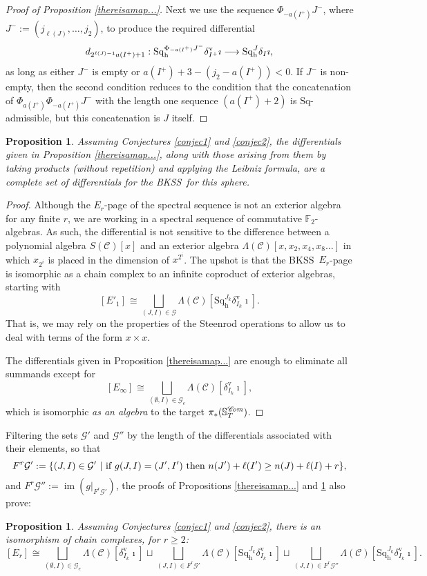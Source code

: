 \documentclass[11pt]{amsart} \renewcommand{\baselinestretch}{1.2}
\theoremstyle{plain}
\newtheorem{prop}[thm]{Proposition}
\numberwithin{equation}{section} %
\theoremstyle{plain}
\newtheorem{prop}[thm]{Proposition}
\numberwithin{equation}{chapter} %
\DeclareMathOperator{\im}{im}
\renewcommand{\to}{\longrightarrow}
\newcommand{\scrC}{\mathscr{C}}
\newcommand{\calg}{\mathcal{G}}
\newcommand{\CommOperad}{{\scrC}}
\newcommand{\Sq}{\mathrm{Sq}}
\newcommand{\F}{\mathbb{F}}
\newcommand{\algs}{{\scrC\!\textit{\normalfont\textit{om}}}}
\newcommand{\Ftwo}{\F_2}
\newcommand{\Eprime}[5]{[E'_{#2}#3]^{#4}_{#5}}
\newcommand{\E}[5]{[E^{#1}_{#2}#3]^{#4}_{#5}}
\newcommand{\uver}{^\mathrm{v}}
\newcommand{\dhor}{_\mathrm{h}}
\newcommand{\Sqh}{\mathrm{Sq}\dhor}
\newcommand{\deltav}{\delta\uver}
\newcommand{\BKSS}{BKSS}
\begin{document}
\begin{The Bousfield-Kan spectral sequence for a sphere}
\begin{proof}[Proof of Proposition \ref{thereisamap...}]
Next we use the sequence $\Phi_{-a(I^{+})}J^{-}$, where $J^-:=(j_{\ell(J)},\ldots,j_2)$, to produce the required differential
\[d_{2^{\ell(J)-1}a(I^{+})+1}:\Sqh^{\Phi_{\smash{-a(I^{+})}}J^{-}}\deltav_{I^{+}}\imath\to \Sqh^J\delta_I\imath,\]
as long as either $J^{-}$ is empty or  $a(I^{+})+3-(j_2-a(I^{+}))< 0$. If $J^{-}$ is non-empty, then the second condition reduces to the condition that the concatenation of $\Phi_{a(I^{+})}\Phi_{-a(I^{+})}J^{-}$ with the length one sequence $(a(I^{+})+2)$ is $\Sq$-admissible, but  this concatenation is $J$ itself.
\end{proof}
\begin{prop}
\label{thats all the difls}
Assuming Conjectures \ref{conjec1} and \ref{conjec2}, the differentials given in Proposition \ref{thereisamap...}, along with those arising from them by taking products (without repetition) and applying the Leibniz formula, are a complete set of differentials for the \BKSS\ for this sphere.
\end{prop}
\begin{proof}
Although the $E_r$-page of the spectral sequence is not an exterior algebra for any finite $r$, we are working in a spectral sequence of commutative $\Ftwo$-algebras. As such, the differential is not sensitive to the difference between a polynomial algebra 
$S(\CommOperad)[x]$ and an exterior algebra $\Lambda(\CommOperad)[x,x_2,x_4,x_8\ldots]$ in which $x_{2^i}$ is placed in the dimension of $x^{2^i}$. The upshot is that  the \BKSS\ $E_r$-page is isomorphic as a chain complex to an infinite coproduct of exterior algebras, starting with
\[\Eprime{blank}{1}{}{}{}\cong\bigsqcup_{(J,I)\in\calg} \Lambda(\CommOperad)[\Sqh^{J_k}\deltav_{I_k}\imath].\]
That is, we may rely on the properties of the Steenrod operations to allow us to deal with terms of the form $x\times x$.

The differentials given in Proposition \ref{thereisamap...} are enough to eliminate all summands except for 
\[\E{}{\infty}{}{}{}\cong\bigsqcup_{(\emptyset,I)\in\calg_e} \Lambda(\CommOperad)[\deltav_{I_k}\imath],\]
which is isomorphic \emph{as an algebra} to the target $\pi_*(\mathbb{S}^{\algs}_T)$.
\end{proof}
Filtering the sets $\calg'$ and $\calg''$ by the length of the differentials associated with their elements, so that
\[F^r\calg':=\{(J,I)\in\calg'\ |\ \textup{if $g(J,I)=(J',I')$ then $n(J')+\ell(I')\geq n(J)+\ell(I)+r$} \},\]
and $F^r\calg'':=\im(g|_{F^r\calg'})$, the  proofs of Propositions \ref{thereisamap...} and \ref{thats all the difls} also prove:
\begin{prop}
\label{the description of the interim pages of the sseq}
Assuming Conjectures \ref{conjec1} and \ref{conjec2}, there is an isomorphism of chain complexes, for $r\geq2$:
\[\E{}{r}{}{}{}\cong 
\bigsqcup_{(\emptyset,I)\in\calg_e} \Lambda(\CommOperad)[\deltav_{I_k}\imath]\sqcup
\bigsqcup_{\!(J,I)\in F^r\calg'\!} \Lambda(\CommOperad)[\Sqh^{J_k}\deltav_{I_k}\imath]\sqcup
\bigsqcup_{\!(J,I)\in F^r\calg''\!} \Lambda(\CommOperad)[\Sqh^{J_k}\deltav_{I_k}\imath]
.\]
\end{prop}


\end{The Bousfield-Kan spectral sequence for a sphere}
\end{document}
